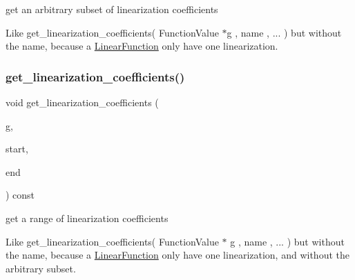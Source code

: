 get an arbitrary subset of linearization coefficients 

Like get\+\_\+linearization\+\_\+coefficients( Function\+Value $\ast$g , name , ... ) but without the name, because a \mbox{\hyperlink{class_s_m_spp__di__unipi__it_1_1_linear_function}{Linear\+Function}} only have one linearization. \mbox{\label{class_s_m_spp__di__unipi__it_1_1_linear_function_ab50b42a38b95f18786faeee3c936c2df}} 
\subsubsection{\texorpdfstring{get\+\_\+linearization\+\_\+coefficients()}{get\_linearization\_coefficients()}\hspace{0.1cm}{\footnotesize\ttfamily [2/4]}}
{\footnotesize\ttfamily void get\+\_\+linearization\+\_\+coefficients (\begin{DoxyParamCaption}\item[{\mbox{\hyperlink{class_s_m_spp__di__unipi__it_1_1_function_a9ad432406b609e28d340f73e9474bffe}{Function\+Value}} $\ast$}]{g,  }\item[{\mbox{\hyperlink{group___thin_var_dep_interface___c_l_a_s_s_e_s_gaee6156e2ce80720d57a082d80f39d8cc}{c\+\_\+\+Index}}}]{start,  }\item[{\mbox{\hyperlink{group___thin_var_dep_interface___c_l_a_s_s_e_s_gaee6156e2ce80720d57a082d80f39d8cc}{c\+\_\+\+Index}}}]{end }\end{DoxyParamCaption}) const}



get a range of linearization coefficients 

Like get\+\_\+linearization\+\_\+coefficients( Function\+Value $\ast$ g , name , ... ) but without the name, because a \mbox{\hyperlink{class_s_m_spp__di__unipi__it_1_1_linear_function}{Linear\+Function}} only have one linearization, and without the arbitrary subset. \mbox{\label{class_s_m_spp__di__unipi__it_1_1_linear_function_a724b5021bd38979148afc99a6a874125}} 
